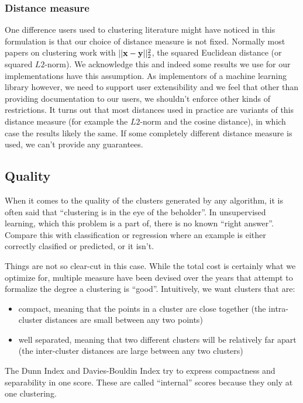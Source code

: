 \documentclass{article}
\begin{document}
\subsubsection{Distance measure}
One difference users used to clustering literature might have noticed in this
formulation is that our
choice of distance measure is not fixed. Normally most papers on clustering
work with $||{\bf x - y}||_2^2$, the squared Euclidean distance (or squared
$L2$-norm). We acknowledge this and indeed some results we use for our
implementations have this assumption. As implementors of a machine learning
library however, we need to support user extensibility and we feel that other
than providing documentation to our users, we shouldn't enforce other kinds of
restrictions. It turns out that most distances used in practice
are variants of this distance measure (for example the $L2$-norm and the cosine
distance), in which case the results likely the same. If some completely
different distance measure is used, we can't provide any guarantees.

\subsection{Quality}

When it comes to the quality of the clusters generated by any algorithm, it is
often said that ``clustering is in the eye of the beholder''.
In unsupervised learning, which this problem is a part of, there is no
known ``right answer''. Compare this with classification or regression where an
example is either correctly clasified or predicted, or it isn't.

Things are not so clear-cut in this case. While the total cost is certainly
what we optimize for, multiple measure have been devised over the years that
attempt to formalize the degree a clustering is ``good''.
Intuitively, we want clusters that are:
\begin{itemize}
    \item compact, meaning that the points in a cluster are close together (the
        intra-cluster distances are small between any two points)
    \item well separated, meaning that two different clusters will be
        relatively far apart (the inter-cluster distances are large between any
        two clusters)
\end{itemize}

The Dunn Index and Davies-Bouldin Index try to express compactness and
separability in one score. These are called ``internal'' scores because they
only at one clustering.
\end{document}
